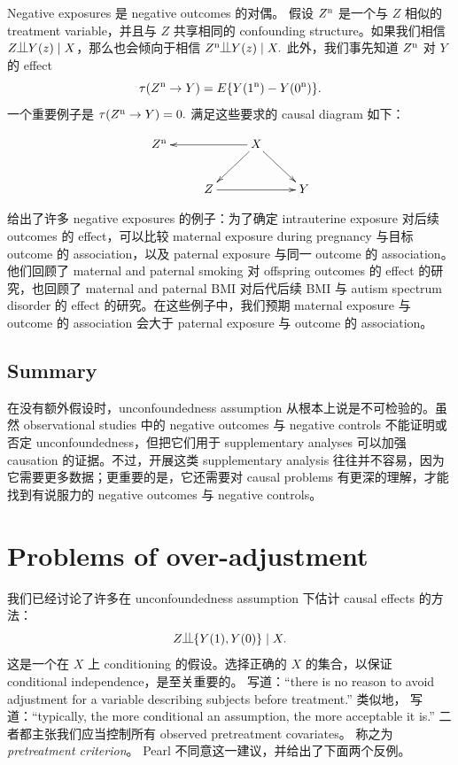  


Negative exposures 是 negative outcomes 的对偶。
假设 $Z^\textup{n}$ 是一个与 $Z$ 相似的 treatment variable，并且与 $Z$ 共享相同的 confounding structure。如果我们相信 $Z \ind Y  (z) \mid X$，那么也会倾向于相信
$
Z^\textup{n}\ind Y  (z) \mid X.
$
此外，我们事先知道 $Z^\textup{n}$ 对 $Y $ 的 effect
$$
\tau(Z^\textup{n}\rightarrow Y  )
= 
E\{  Y(1^\textup{n}) - Y (0^\textup{n}) \}.
$$
一个重要例子是 $\tau(Z^\textup{n}\rightarrow Y  ) = 0.$ 满足这些要求的 causal diagram 如下：


$$
\xymatrix{
Z^\textup{n} & & X \ar[ll] \ar[ld]\ar[rd] \\
&Z  \ar[rr] && Y 
}
$$




\begin{example}
\citet{sanderson2017negative} 给出了许多 negative exposures 的例子：为了确定 intrauterine exposure 对后续 outcomes 的 effect，可以比较 maternal exposure during pregnancy 与目标 outcome 的 association，以及 paternal exposure 与同一 outcome 的 association。他们回顾了 maternal and paternal smoking 对 offspring outcomes 的 effect 的研究，也回顾了 maternal and paternal BMI 对后代后续 BMI 与 autism spectrum disorder 的 effect 的研究。在这些例子中，我们预期 maternal exposure 与 outcome 的 association 会大于 paternal exposure 与 outcome 的 association。
\end{example}



\subsection{Summary}


在没有额外假设时，unconfoundedness assumption 从根本上说是不可检验的。虽然 observational studies 中的 negative outcomes 与 negative controls 不能证明或否定 unconfoundedness，但把它们用于 supplementary analyses 可以加强 causation 的证据。不过，开展这类 supplementary analysis 往往并不容易，因为它需要更多数据；更重要的是，它还需要对 causal problems 有更深的理解，才能找到有说服力的 negative outcomes 与 negative controls。

 
 


\section{Problems of over-adjustment}
\label{sec::pearl-bias}

我们已经讨论了许多在 unconfoundedness assumption 下估计 causal effects 的方法：
$$
Z\ind \{ Y(1), Y(0) \} \mid X .
$$
这是一个在 $X$ 上 conditioning 的假设。选择正确的 $X$ 的集合，以保证 conditional independence，是至关重要的。
\citet{rosenbaum2002design} 写道：``there is no reason to avoid adjustment for a variable describing subjects before treatment.'' 类似地，\citet{rubin2007design} 写道：``typically, the more conditional an assumption, the more acceptable it is.'' 二者都主张我们应当控制所有 observed pretreatment covariates。\citet{vanderweele2011new} 称之为 {\it pretreatment criterion}。
Pearl 不同意这一建议，并给出了下面两个反例。


